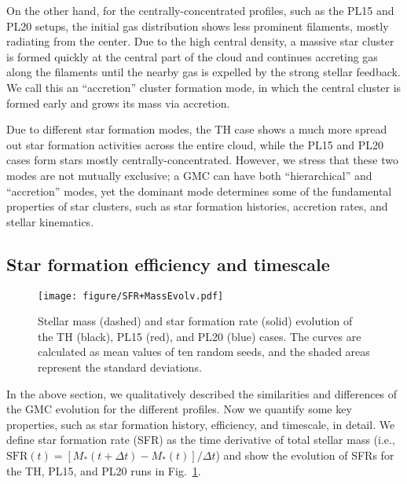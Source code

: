 \documentclass[fleqn,usenatbib]{mnras}
\begin{document}
On the other hand, for the centrally-concentrated profiles, such as the PL15 and PL20 setups, the initial gas distribution shows less prominent filaments, mostly radiating from the center.
Due to the high central density, a massive star cluster is formed quickly at the central part of the cloud and continues accreting gas along the filaments until the nearby gas is expelled by the strong stellar feedback.
We call this an ``accretion'' cluster formation mode, in which the central cluster is formed early and grows its mass via accretion.

Due to different star formation modes, the TH case shows a much more spread out star formation activities across the entire cloud, while the PL15 and PL20 cases form stars mostly centrally-concentrated.
However, we stress that these two modes are not mutually exclusive; a GMC can have both ``hierarchical'' and ``accretion'' modes, yet the dominant mode determines some of the fundamental properties of star clusters, such as star formation histories, accretion rates, and stellar kinematics.

\subsection{Star formation efficiency and timescale}
\label{sec:invarianceOfSFE}

\begin{figure}
\texttt{[image: figure/SFR+MassEvolv.pdf]}
\caption{Stellar mass (dashed) and star formation rate (solid) evolution of the TH (black), PL15 (red), and PL20 (blue) cases. The curves are calculated as mean values of ten random seeds, and the shaded areas represent the standard deviations.}
  \label{fig:SFR}
\end{figure}

In the above section, we qualitatively described the similarities and differences of the GMC evolution for the different profiles.
Now we quantify some key properties, such as star formation history, efficiency, and timescale, in detail.
We define star formation rate (SFR) as the time derivative of total stellar mass (i.e., $\mathrm{SFR}(t)=[M_*(t+\Delta t)-M_*(t)]/\Delta t$) and show the evolution of SFRs for the TH, PL15, and PL20 runs in Fig.~\ref{fig:SFR}.
\end{document}
